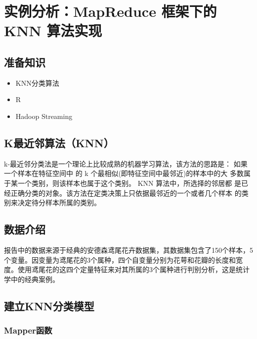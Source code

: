 \section{实例分析：MapReduce 框架下的 KNN
算法实现}\label{ux5b9eux4f8bux5206ux6790mapreduce-ux6846ux67b6ux4e0bux7684-knn-ux7b97ux6cd5ux5b9eux73b0}

\subsection{准备知识}\label{ux51c6ux5907ux77e5ux8bc6}

\begin{itemize}
\itemsep1pt\parskip0pt
\item
  KNN分类算法
\item
  R
\item
  Hadoop Streaming
\end{itemize}

\subsection{K最近邻算法（KNN）}\label{kux6700ux8fd1ux90bbux7b97ux6cd5knn}

k-最近邻分类法是一个理论上比较成熟的机器学习算法，该方法的思路是：
如果一个样本在特征空间中 的 k 个最相似(即特征空间中最邻近)的样本中的大
多数属于某一个类别，则该样本也属于这个类别。 KNN 算法中，所选择的邻居都
是已经正确分类的对象。该方法在定类决策上只依据最邻近的一个或者几个样本
的类别来决定待分样本所属的类别。

\subsection{数据介绍}\label{ux6570ux636eux4ecbux7ecd}
报告中的数据来源于经典的安德森鸢尾花卉数据集，其数据集包含了150个样本，5个变量。因变量为鸢尾花的3个属种，四个自变量分别为花萼和花瓣的长度和宽度。使用鸢尾花的这四个定量特征来对其所属的3个属种进行判别分析，这是统计学中的经典案例。

\subsection{建立KNN分类模型}\label{ux5efaux7acbknnux5206ux7c7bux6a21ux578b}

\subsubsection{Mapper函数}\label{mapperux51fdux6570}

